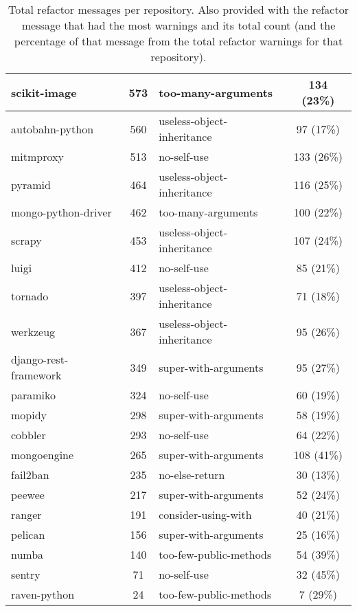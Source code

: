 \begin{table}[ht]
\begin{tabularx}{0.8\textwidth} {
    | l 
    | c
    | >{\centering\arraybackslash}X 
    | c |
  }
    scikit-image & 573 & too-many-arguments & 134 (23\%) \\ \hline
    autobahn-python & 560 & useless-object-inheritance & 97 (17\%) \\ \hline
    mitmproxy & 513 & no-self-use & 133 (26\%) \\ \hline
    pyramid & 464 & useless-object-inheritance & 116 (25\%) \\ \hline
    mongo-python-driver & 462 & too-many-arguments & 100 (22\%) \\ \hline
    scrapy & 453 & useless-object-inheritance & 107 (24\%) \\ \hline
    luigi & 412 & no-self-use & 85 (21\%) \\ \hline
    tornado & 397 & useless-object-inheritance & 71 (18\%) \\ \hline
    werkzeug & 367 & useless-object-inheritance & 95 (26\%) \\ \hline
    django-rest-framework & 349 & super-with-arguments & 95 (27\%) \\ \hline
    paramiko & 324 & no-self-use & 60 (19\%) \\ \hline
    mopidy & 298 & super-with-arguments & 58 (19\%) \\ \hline
    cobbler & 293 & no-self-use & 64 (22\%) \\ \hline
    mongoengine & 265 & super-with-arguments & 108 (41\%) \\ \hline
    fail2ban & 235 & no-else-return & 30 (13\%) \\ \hline
    peewee & 217 & super-with-arguments & 52 (24\%) \\ \hline
    ranger & 191 & consider-using-with & 40 (21\%) \\ \hline
    pelican & 156 & super-with-arguments & 25 (16\%) \\ \hline
    numba & 140 & too-few-public-methods & 54 (39\%) \\ \hline
    sentry & 71 & no-self-use & 32 (45\%) \\ \hline
    raven-python & 24 & too-few-public-methods & 7 (29\%) \\ \hline
  \end{tabularx}
  \caption{Total refactor messages per repository. Also provided with the refactor message that had the most warnings and its total count (and the percentage of that message from the total refactor warnings for that repository).}
  \label{table:refactorWarningTotals}
\end{table}

